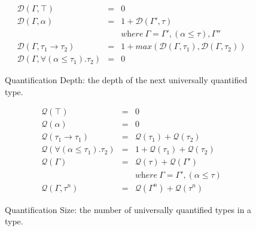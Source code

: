 \documentclass[runningheads, anon]{llncs}
\begin{document}
\begin{figure}[t]
\begin{minipage}{\linewidth}
\[
\begin{array}{lcl}
\mathcal{D}(\Gamma, \top)
			& =
			& 0 \\
\mathcal{D}(\Gamma, \alpha)
			& =
			& 1 + \mathcal{D}(\Gamma', \tau) \\

			&
			& \textit{where}\ \Gamma = \Gamma', (\alpha \leqslant \tau), \Gamma'' \\
\mathcal{D}(\Gamma, \tau_1 \rightarrow \tau_2)
			& =
			& 1 + max(\mathcal{D}(\Gamma, \tau_1), \mathcal{D}(\Gamma, \tau_2)) \\
\mathcal{D}(\Gamma, \forall(\alpha \leqslant \tau_1).\tau_2)
			& =
			& 0
\end{array}
\]
\caption{Quantification Depth: the depth of the next universally quantified type.}
\label{f:quantDepth}
\end{minipage}
\end{figure}
\begin{figure}[t]
\begin{minipage}{\linewidth}
\[
\begin{array}{lcl}
\mathcal{Q}(\top)
			& =
			& 0 \\
\mathcal{Q}(\alpha)
			& =
			& 0 \\
\mathcal{Q}(\tau_1 \rightarrow \tau_1)
			& =
			& \mathcal{Q}(\tau_1) + \mathcal{Q}(\tau_2)  \\
\mathcal{Q}(\forall(\alpha \leqslant \tau_1).\tau_2)
			& =
			& 1 + \mathcal{Q}(\tau_1) + \mathcal{Q}(\tau_2)\\
\mathcal{Q}(\Gamma)
			& =
			& \mathcal{Q}(\tau) + \mathcal{Q}(\Gamma') \\

			&
			& \textit{where}\ \Gamma = \Gamma', (\alpha \leqslant \tau)\\
\mathcal{Q}(\Gamma, \tau^n)
			& =
			& \mathcal{Q}(\Gamma^n) + \mathcal{Q}(\tau^n)
			
\end{array}
\]
\caption{Quantification Size: the number of universally quantified types in a type.}
\label{f:quantSize}
\end{minipage}
\end{figure}
\end{document}

